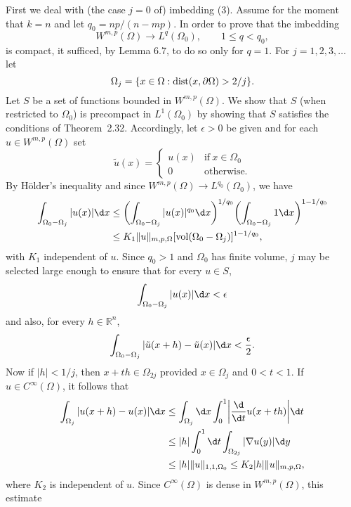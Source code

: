 \begin{para}
  First we deal with (the case $j=0$ of) imbedding (3). Assume for the moment that $k=n$
  and let $q_0 = np/(n-mp)$. In order to prove that the imbedding
  \begin{equation}\label{eq:6.10}
    W^{m,p}(\Omega) \to L^q(\Omega_0), \qquad 1\leq q<q_0,
  \end{equation}
  is compact, it sufficed, by Lemma 6.7, to do so only for $q=1$.
  For $j=1,2,3,\ldots$ let
  \[ \Omega_j = \{x\in\Omega : \operatorname{dist}(x, \partial\Omega) > 2/j \}. \]
  Let $S$ be a set of functions bounded in $W^{m,p}(\Omega)$. We show that $S$
  (when restricted to $\Omega_0$) is precompact in $L^1(\Omega_0)$ by showing that $S$
  satisfies the conditions of Theorem~2.32. Accordingly, let $\epsilon>0$
  be given and for each $u\in W^{m,p}(\Omega)$ set
  \[ \tilde{u}(x) = \begin{cases}
    u(x) & \text{if}\ x\in\Omega_0 \\
    0    & \text{otherwise.}
  \end{cases} \]
  By H\"older's inequality and since $W^{m,p}(\Omega)\to L^{q_0}(\Omega_0)$, we have
  \begin{align*}
    \int_{\Omega_0-\Omega_j} |u(x)| \d x
    & \leq \biggl(\int_{\Omega_0-\Omega_j} |u(x)|^{q_0} \d x\biggr)^{1/q_0}
           \biggl(\int_{\Omega_0-\Omega_j} 1 \d x\biggr)^{1-1/q_0} \\
    & \leq K_1 \|u\|_{m,p,\Omega} [\vol(\Omega_0-\Omega_j)]^{1-1/q_0},
  \end{align*}
  with $K_1$ independent of $u$. Since $q_0>1$ and $\Omega_0$ has finite volume,
  $j$ may be selected large enough to ensure that for every $u\in S$,
  \[\int_{\Omega_0-\Omega_j} |u(x)| \d x < \epsilon \]
  and also, for every $h\in\mathbb{R}^n$,
  \[\int_{\Omega_0-\Omega_j} |\tilde{u}(x+h) - \tilde{u}(x)| \d x < \frac{\epsilon}{2}.\]
  Now if $|h|<1/j$, then $x+th\in \Omega_{2j}$ provided $x\in\Omega_j$ and $0<t<1$.
  If $u\in C^\infty(\Omega)$, it follows that
  \begin{align*}
    \int_{\Omega_j} |u(x+h)-u(x)| \d x
    & \leq \int_{\Omega_j} \d x \int_0^1 \biggl|\frac{\d}{\d t} u(x+th)\biggr| \d t \\
    & \leq |h| \int_0^1 \d t \int_{\Omega_{2j}} |\nabla u(y)| \d y \\
    & \leq |h| \|u\|_{1,1,\Omega_0}
      \leq K_2 |h| \|u\|_{m,p,\Omega},
  \end{align*}
  where $K_2$ is independent of $u$.
  Since $C^\infty(\Omega)$ is dense in $W^{m,p}(\Omega)$, this estimate

\end{para}
